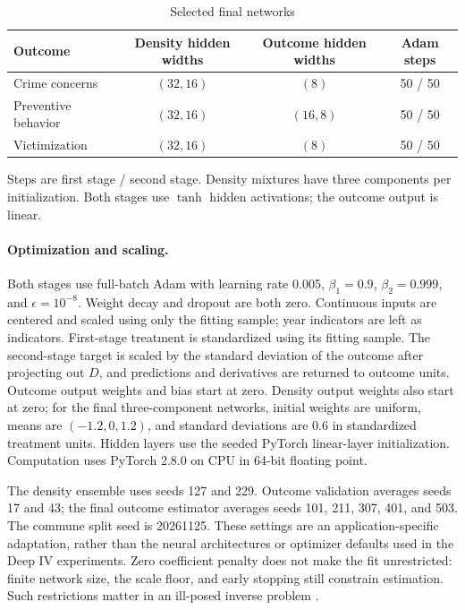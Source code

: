 \begin{table}[H]
\centering
\caption{Selected final networks}
\label{tab:neural-settings}
\small
\begin{tabularx}{\linewidth}{@{}Xccc@{}}
\toprule
Outcome & Density hidden widths & Outcome hidden widths & Adam steps\\
\midrule
Crime concerns & $(32,16)$ & $(8)$ & 50 / 50\\
Preventive behavior & $(32,16)$ & $(16,8)$ & 50 / 50\\
Victimization & $(32,16)$ & $(8)$ & 50 / 50\\
\bottomrule
\end{tabularx}
\smallskip
\parbox{\linewidth}{\footnotesize Steps are first stage / second stage. Density mixtures have three components per initialization. Both stages use $\tanh$ hidden activations; the outcome output is linear.}
\end{table}

\paragraph{Optimization and scaling.}
Both stages use full-batch Adam with learning rate 0.005, $\beta_1=0.9$, $\beta_2=0.999$, and $\epsilon=10^{-8}$. Weight decay and dropout are both zero. Continuous inputs are centered and scaled using only the fitting sample; year indicators are left as indicators. First-stage treatment is standardized using its fitting sample. The second-stage target is scaled by the standard deviation of the outcome after projecting out $D$, and predictions and derivatives are returned to outcome units. Outcome output weights and bias start at zero. Density output weights also start at zero; for the final three-component networks, initial weights are uniform, means are $(-1.2,0,1.2)$, and standard deviations are 0.6 in standardized treatment units. Hidden layers use the seeded PyTorch linear-layer initialization. Computation uses PyTorch 2.8.0 on CPU in 64-bit floating point.

The density ensemble uses seeds 127 and 229. Outcome validation averages seeds 17 and 43; the final outcome estimator averages seeds 101, 211, 307, 401, and 503. The commune split seed is 20261125. These settings are an application-specific adaptation, rather than the neural architectures or optimizer defaults used in the Deep IV experiments. Zero coefficient penalty does not make the fit unrestricted: finite network size, the scale floor, and early stopping still constrain estimation. Such restrictions matter in an ill-posed inverse problem \cite{neweypowell}.

